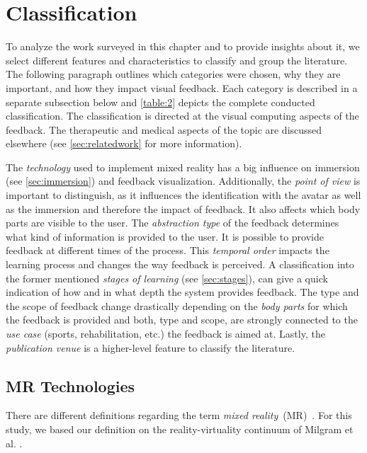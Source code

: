 \section{Classification \label{sec:classification}}
To analyze the work surveyed in this chapter and to provide insights about it, we select different features and characteristics to classify and group the literature. The following paragraph outlines which categories were chosen, why they are important, and how they impact visual feedback. Each category is described in a separate subsection below and \autoref{table:2} depicts the complete conducted classification. The classification is directed at the visual computing aspects of the feedback. The therapeutic and medical aspects of the topic are discussed elsewhere (see \autoref{sec:relatedwork} for more information).


The \textit{technology} used to implement mixed reality has a big influence on immersion (see \autoref{sec:immersion}) and feedback visualization. Additionally, the \textit{point of view} is important to distinguish, as it influences the identification with the avatar as well as the immersion and therefore the impact of feedback. It also affects which body parts are visible to the user. The \textit{abstraction type} of the feedback determines what kind of information is provided to the user. It is possible to provide feedback at different times of the process. This \textit{temporal order} impacts the learning process and changes the way feedback is perceived. A classification into the former mentioned \textit{stages of learning} (see \autoref{sec:stages}), can give a quick indication of how and in what depth the system provides feedback. The type and the scope of feedback change drastically depending on the \textit{body parts} for which the feedback is provided and both, type and scope, are strongly connected to the \emph{use case} (sports, rehabilitation, etc.) the feedback is aimed at. Lastly, the \textit{publication venue} is a higher-level feature to classify the literature.

\subsection*{MR Technologies \label{sec:MR}}
There are different definitions regarding the term \emph{mixed reality}~(MR)~\cite{whatIsMR}. For this study, we based our definition on the reality-virtuality continuum of Milgram et al. \cite{milgram1994arc}.

